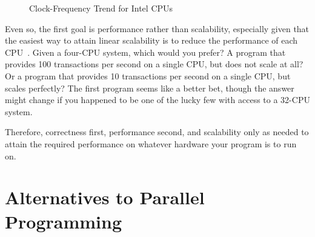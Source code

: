 \begin{figure}[htb]
\begin{center}
\end{center}
\caption{Clock-Frequency Trend for Intel CPUs}
\label{fig:intro:Clock-Frequency Trend for Intel CPUs}
\end{figure}

Even so, the first goal is performance rather than scalability,
especially given that the easiest way to attain linear scalability
is to reduce the performance of each CPU~\cite{LinusTorvalds2001a}.
Given a four-CPU system, which would you prefer?
A program that provides 100 transactions per second on a single CPU,
but does not scale at all?
Or a program that provides 10 transactions per second on a single CPU,
but scales perfectly?
The first program seems like a better bet, though the answer might
change if you happened to be one of the lucky few with access to a
32-CPU system.

Therefore, correctness first, performance second,
and scalability only as needed to
attain the required performance on whatever hardware your program
is to run on.

\section{Alternatives to Parallel Programming}
\label{sec:intro:Alternatives to Parallel Programming}

